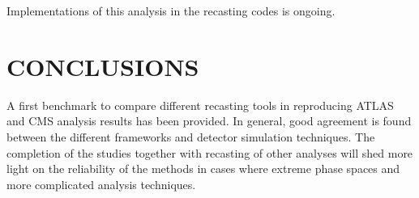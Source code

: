 \documentclass[11pt]{cernrep}
\begin{document}
Implementations of this analysis in the recasting codes is ongoing. 


\section*{CONCLUSIONS}
A first benchmark to compare different recasting tools in reproducing ATLAS and CMS analysis results has been provided.
In general, good agreement is found between the different frameworks and detector simulation techniques.
The completion of the studies together with recasting of other analyses will shed more light
on the reliability of the methods in cases where extreme phase spaces and more complicated analysis techniques.



\end{document}

